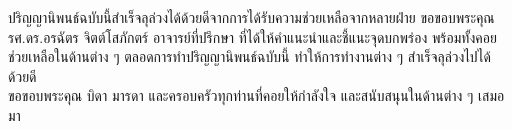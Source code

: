 \indent
ปริญญานิพนธ์ฉบับนี้สำเร็จลุล่วงได้ด้วยดีจากการได้รับความช่วยเหลือจากหลายฝ่าย ขอขอบพระคุณ รศ.ดร.อรฉัตร  จิตต์โสภักตร์ อาจารย์ที่ปรึกษา ที่ได้ให้คำแนะนำและชี้แนะจุดบกพร่อง พร้อมทั้งคอยช่วยเหลือในด้านต่าง ๆ ตลอดการทำปริญญานิพนธ์ฉบับนี้ ทำให้การทำงานต่าง ๆ สำเร็จลุล่วงไปได้ด้วยดี
\\
\indent
ขอขอบพระคุณ บิดา มารดา และครอบครัวทุกท่านที่คอยให้กำลังใจ และสนับสนุนในด้านต่าง ๆ เสมอมา